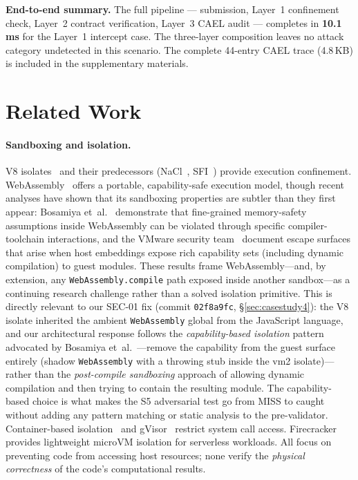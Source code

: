 \documentclass[letterpaper,twocolumn,10pt]{article}
\begin{document}
\textbf{End-to-end summary.}  The full pipeline --- submission,
Layer~1 confinement check, Layer~2 contract verification, Layer~3
CAEL audit --- completes in \textbf{10.1\,ms} for the Layer~1
intercept case.  The three-layer composition leaves no attack
category undetected in this scenario.  The complete 44-entry CAEL
trace (4.8\,KB) is included in the supplementary materials.



\section{Related Work}
\label{sec:related}

\paragraph{Sandboxing and isolation.}
V8 isolates~\cite{nickel2020isolate} and their predecessors
(NaCl~\cite{yee2009native}, SFI~\cite{wahbe1993efficient}) provide
execution confinement. WebAssembly~\cite{haas2017wasm} offers a
portable, capability-safe execution model, though recent analyses
have shown that its sandboxing properties are subtler than they
first appear: Bosamiya et~al.~\cite{cao2022wasmsandbox} demonstrate that
fine-grained memory-safety assumptions inside WebAssembly can be
violated through specific compiler-toolchain interactions, and the
VMware security team~\cite{vmware2023wasmsec} document escape
surfaces that arise when host embeddings expose rich capability
sets (including dynamic compilation) to guest modules. These results
frame WebAssembly---and, by extension, any \texttt{WebAssembly.compile}
path exposed inside another sandbox---as a continuing research
challenge rather than a solved isolation primitive. This is directly
relevant to our SEC-01 fix (commit \texttt{02f8a9fc},
\S\ref{sec:casestudy4}): the V8 isolate inherited the ambient
\texttt{WebAssembly} global from the JavaScript language, and our
architectural response follows the \emph{capability-based isolation}
pattern advocated by Bosamiya et~al.~\cite{cao2022wasmsandbox}---remove the
capability from the guest surface entirely (shadow \texttt{WebAssembly}
with a throwing stub inside the vm2 isolate)---rather than the
\emph{post-compile sandboxing} approach of allowing dynamic compilation
and then trying to contain the resulting module. The capability-based
choice is what makes the S5 adversarial test go from MISS to caught
without adding any pattern matching or static analysis to the
pre-validator. Container-based
isolation~\cite{merkel2014docker} and gVisor~\cite{gvisor2019}
restrict system call access. Firecracker~\cite{agache2020firecracker}
provides lightweight microVM isolation for serverless workloads.
All focus on preventing code from accessing host resources; none
verify the \emph{physical correctness} of the code's computational
results.
\end{document}
